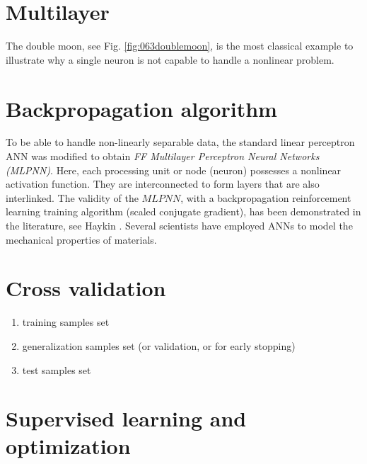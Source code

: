 \section{Multilayer}
\label{sec:multilayer}

The double moon, see Fig. \ref{fig:063doublemoon}, is the most classical
example  to illustrate why a single neuron is not capable to handle a
nonlinear problem.\\


\section{Backpropagation algorithm}
\label{sec:backpropagationalgorithm}

To be able to handle non-linearly separable data, the standard linear perceptron
\acs{ANN} was modified to obtain \textit{FF Multilayer Perceptron Neural Networks
(MLPNN)}.
Here, each processing unit or node (neuron) possesses a nonlinear activation function. 
They are interconnected to form layers that are also interlinked. 
The validity of the $MLPNN$, with a backpropagation reinforcement learning 
training algorithm (scaled conjugate gradient), has been demonstrated in the 
literature, see Haykin \cite{RefWorks:158}. Several scientists 
\cite{RefWorks:161, RefWorks:166, RefWorks:167, RefWorks:168, RefWorks:169,
RefWorks:170, RefWorks:178, RefWorks:179} have employed \acs{ANNs} to model
the mechanical properties of materials.

\section{Cross validation}
\label{sec:crossvalidation}

\begin{enumerate}
  \item{training samples set}
  \item{generalization samples set (or validation, or for early stopping)}
  \item{test samples set}
\end{enumerate}

\section{Supervised learning and optimization}
\label{sec:supervisedlearningandoptimization}

